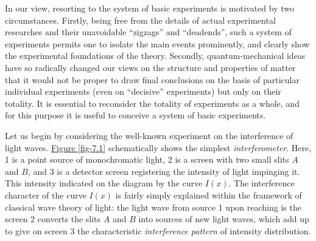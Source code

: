 \documentclass[a4paper,sfsidenotes,colorlinks=true]{tufte-book}
\numberwithin{equation}{section}
\numberwithin{figure}{section}
\begin{document}
In our view, resorting to the system of basic experiments is motivated by two circumstances. Firstly, being free
from the details of actual experimental researches and their unavoidable ``zigzags'' and ``deadends'', such a system of experiments permits one to isolate the main events prominently, and clearly show the experimental foundations of the theory. Secondly, quantum-mechanical ideas have so radically changed our views on the structure and properties of matter that it would not be proper to draw final conclusions on the basis of particular individual experiments (even on ``decisive'' experiments) but only on their totality. It is essential to reconsider the totality of experiments as a whole, and for this purpose it is useful to conceive a system of basic experiments. 


Let us begin by considering the well-known experiment on the interference of light waves. \hyperref[fig-7.1]{Figure \ref{fig-7.1}} schematically shows the simplest \emph{interferometer}. Here, \textsf{1} is a point source of monochromatic light, \textsf{2} is a screen with two small slits $A$ and $B$, and \textsf{3} is a detector screen registering the intensity of light impinging it. This intensity indicated on the diagram by the curve $I(x)$. The interference character of the curve $I(x)$ is fairly simply
explained within the framework of classical wave theory of light:  the light wave from source \textsf{1} upon reaching is the screen \textsf{2} converts the slits $A$ and $B$ into sources of new light waves, which add up to give on screen \textsf{3} the characteristic \emph{interference pattern} of intensity distribution.
\end{document}
